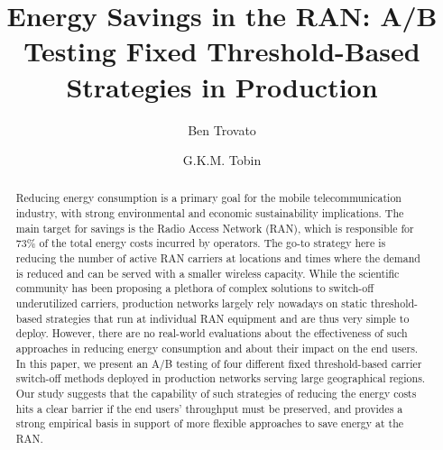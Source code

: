 \documentclass[10pt,sigconf,letterpaper,anonymous,nonacm]{acmart}
\begin{document}
\title{Energy Savings in the RAN: A/B Testing Fixed Threshold-Based Strategies in Production}

\author{Ben Trovato}
\author{G.K.M. Tobin}
\authornotemark[1]

\renewcommand{\shortauthors}{Trovato et al.}

\begin{abstract}
Reducing energy consumption is a primary goal for the mobile telecommunication industry, with strong environmental and economic sustainability implications. The main target for savings is the Radio Access Network (RAN), which is responsible for 73\% of the total energy costs incurred by operators.
The go-to strategy here is reducing the number of active RAN carriers at locations and times where the demand is reduced and can be served with a smaller wireless capacity.
While the scientific community has been proposing a plethora of complex solutions to switch-off underutilized carriers, production networks largely rely nowadays on static threshold-based strategies that run at individual RAN equipment and are thus very simple to deploy.
However, there are no real-world evaluations about the effectiveness of such approaches in reducing energy consumption and about their impact on the end users.
In this paper, we present an A/B testing of four different fixed threshold-based carrier switch-off methods deployed in production networks serving large geographical regions.
Our study suggests that the capability of such strategies of reducing the energy costs hits a clear barrier if the end users' throughput must be preserved, and provides a strong empirical basis in support of more flexible approaches to save energy at the RAN.
%
\end{abstract}
\end{document}
